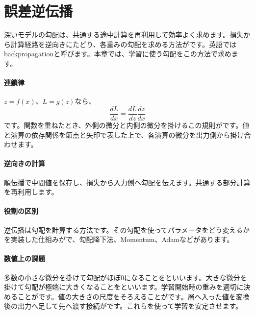 \section{誤差逆伝播}
\label{sec:06-machine-learning-20}

深いモデルの勾配は、共通する途中計算を再利用して効率よく求めます。損失から計算経路を逆向きにたどり、各重みの勾配を求める方法がです。英語ではbackpropagationと呼びます。本章では、学習に使う勾配をこの方法で求めます。

\begingroup
\begingroup
\paragraph{連鎖律}
        $z=f(x)$、$L=g(z)$なら、
        \[
          \frac{dL}{dx}
          =\frac{dL}{dz}\frac{dz}{dx}
        \]
        です。関数を重ねたとき、外側の微分と内側の微分を掛けるこの規則がです。値と演算の依存関係を節点と矢印で表した上で、各演算の微分を出力側から掛け合わせます。

\paragraph{逆向きの計算}
        順伝播で中間値を保存し、損失から入力側へ勾配を伝えます。共通する部分計算を再利用します。

\par
\endgroup
\medskip
\begingroup
\paragraph{役割の区別}
        逆伝播は勾配を計算する方法です。その勾配を使ってパラメータをどう変えるかを実装した仕組みがで、勾配降下法、Momentum、Adamなどがあります。

\paragraph{数値上の課題}
        多数の小さな微分を掛けて勾配がほぼ0になることをといいます。大きな微分を掛けて勾配が極端に大きくなることをといいます。学習開始時の重みを適切に決めることがです。値の大きさの尺度をそろえることがです。層へ入った値を変換後の出力へ足して先へ渡す接続がです。これらを使って学習を安定させます。

\par
\endgroup
\par
\endgroup


